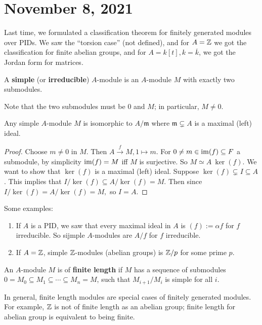 \section{November 8, 2021} 
Last time, we formulated a classification theorem for finitely generated modules over PIDs. We saw the ``torsion case'' (not defined), and for $A=\mathbb{Z}$ we got the classification for finite abelian groups, and for $A=k[t],k=\overline{k}$, we got the Jordan form for matrices.

\begin{definition}[]
    A \textbf{simple} (or \textbf{irreducible}) $A$-module is an $A$-module $M$ with exactly two submodules.
\end{definition}
Note that the two submodules must be 0 and $M$; in particular, $M\neq 0$.
\begin{lemma}
    Any simple $A$-module $M$ is isomorphic to $A / \mathfrak m$ where $\mathfrak m \subsetneq A$ is a maximal (left) ideal.
\end{lemma}
\begin{proof}
    Choose $m\neq 0$ in $M$. Then $A \xrightarrow fM, 1 \mapsto  m$. For $0\neq m \in \operatorname{im}(f) \subseteq F$ a submodule, by simplicity $\operatorname{im}(f)=M$ iff $M$ is surjective. So $M \simeq A \ \ker (f)$. We want to show that $\ker(f)$ is a maximal (left) ideal. Suppose $\ker(f) \subsetneq  I \subseteq A$. This implies that $I / \ker(f) \subseteq A /\ker(f) =M$. Then since $I/\ker(f) = A / \ker(f)=M,$ so $I=A$.
\end{proof}
\begin{example}Some examples:
    \begin{enumerate}[label=(\arabic*)]
    \setlength\itemsep{-.2em}
        \item If $A$ is a PID, we saw that every maximal ideal in $A$ is $(f) := \alpha  f$ for $f$ irreducible. So sijmple $A$-modules are $A /f$ for $f$ irreducible.
        \item If $A=\mathbb{Z}$, simple $\mathbb{Z}$-modules (abelian groups) is  $\mathbb{Z} /p$ for some prime $p$.
    \end{enumerate}
\end{example}
\begin{definition}[]
    An $A$-module $M$ is of \textbf{finite length} if $M$ has a sequence of submodules $0=M_0 \subseteq M_1 \subseteq  \cdots  \subseteq M_n =M$, such that $M _{i+1} / M_i $ is simple for all $i$.
\end{definition}
In general, finite length modules are special cases of finitely generated modules. For example, $\mathbb{Z}$ is not of finite length as an abelian group; finite length for abelian group is equivalent to being finite.

